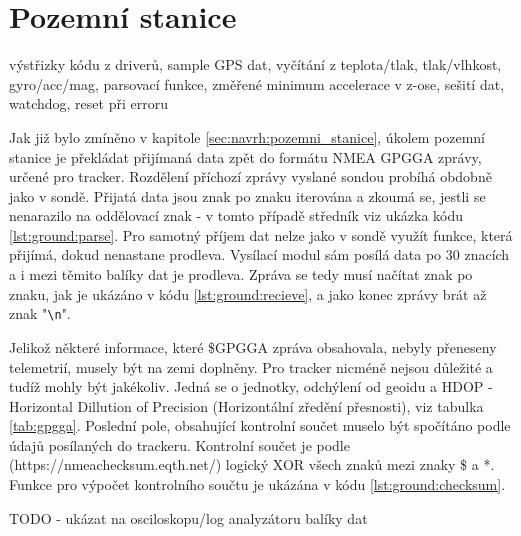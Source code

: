 \documentclass[twoside]{ctuthesis}
\theoremstyle{plain}
\theoremstyle{definition}
\theoremstyle{note}
\begin{document}
	

	







	\section{Pozemní stanice}
	výstřizky kódu z driverů, sample GPS dat, vyčítání z teplota/tlak, tlak/vlhkost, gyro/acc/mag, parsovací funkce, změřené minimum accelerace v z-ose, sešití dat, watchdog, reset při erroru

	Jak již bylo zmíněno v kapitole \ref{sec:navrh:pozemni_stanice}, úkolem pozemní stanice je překládat přijímaná data zpět do formátu NMEA GPGGA zprávy, určené pro tracker. Rozdělení příchozí zprávy vyslané sondou probíhá obdobně jako v sondě. Přijatá data jsou znak po znaku iterována a zkoumá se, jestli se nenarazilo na oddělovací znak - v tomto případě středník viz ukázka kódu \ref{lst:ground:parse}. Pro samotný příjem dat nelze jako v sondě využít funkce, která přijímá, dokud nenastane prodleva. Vysílací modul sám posílá data po 30 znacích a i mezi těmito balíky dat je prodleva. Zpráva se tedy musí načítat znak po znaku, jak je ukázáno v kódu \ref{lst:ground:recieve}, a jako konec zprávy brát až znak "\lstinline |\n|".

	

	

	Jelikož některé informace, které \$GPGGA zpráva obsahovala, nebyly přeneseny telemetrií, musely být na zemi doplněny. Pro tracker nicméně nejsou důležité a tudíž mohly být jakékoliv. Jedná se o jednotky, odchýlení od geoidu a HDOP - Horizontal Dillution of Precision (Horizontální zředění přesnosti), viz tabulka \ref{tab:gpgga}. Poslední pole, obsahující kontrolní součet muselo být spočítáno podle údajů posílaných do trackeru. Kontrolní součet je podle (https://nmeachecksum.eqth.net/) logický XOR všech znaků mezi znaky \$ a *. Funkce pro výpočet kontrolního součtu je ukázána v kódu \ref{lst:ground:checksum}.

	

	TODO - ukázat na osciloskopu/log analyzátoru balíky dat
\end{document}
